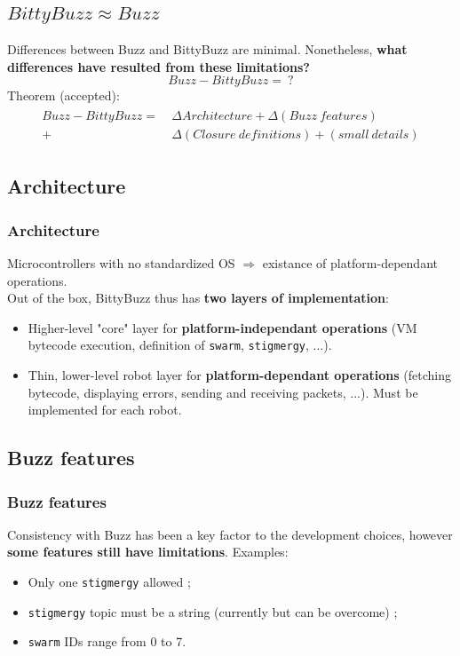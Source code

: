 \documentclass{beamer}
\begin{document}
	\begin{frame}
		\section{$BittyBuzz \approx Buzz$}
		Differences between Buzz and BittyBuzz are minimal. Nonetheless, \textbf{what differences have resulted from these limitations?}\\
		\[Buzz - BittyBuzz =~?\]
		Theorem (accepted):
		\begin{align}
		\begin{split}
		Buzz - BittyBuzz = ~&\Delta Architecture + \Delta (Buzz~features)\\
		+ &\Delta (Closure~definitions) + (small~details)
		\end{split}
		\end{align}
	\end{frame}
	\begin{frame}
		\subsection{Architecture}
		\frametitle{Architecture}
		Microcontrollers with no standardized OS $\Rightarrow$ existance of platform-dependant operations.\\
		Out of the box, BittyBuzz thus has \textbf{two layers of implementation}:
		\begin{itemize}
			\item Higher-level "core" layer for \textbf{platform-independant operations} (VM bytecode execution, definition of \texttt{swarm}, \texttt{stigmergy}, ...).
			\item Thin, lower-level robot layer for \textbf{platform-dependant operations} (fetching bytecode, displaying errors, sending and receiving packets, ...). Must be implemented for each robot.
		\end{itemize}
	\end{frame}
	\begin{frame}
		\subsection{Buzz features}
		\frametitle{Buzz features}
		Consistency with Buzz has been a key factor to the development choices, however \textbf{some features still have limitations}. Examples:
		\begin{itemize}
			\item Only one \texttt{stigmergy} allowed ;
			\item \texttt{stigmergy} topic must be a string (currently but can be overcome) ;
			\item \texttt{swarm} IDs range from 0 to 7.
		\end{itemize}
	\end{frame}
\end{document}
